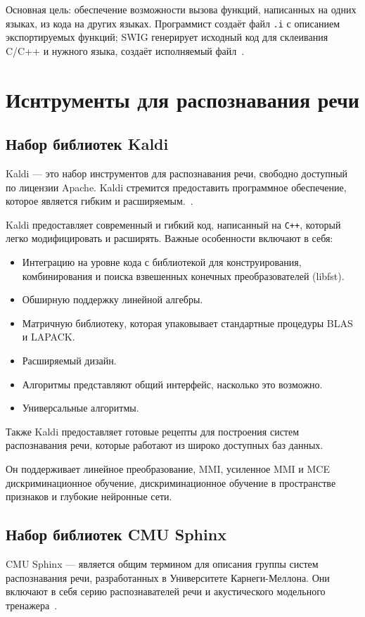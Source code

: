 Основная цель: обеспечение возможности вызова
функций, написанных на одних языках, из кода на других языках. Программист
создаёт файл \texttt{.i} с описанием экспортируемых функций; SWIG генерирует исходный код
для склеивания C/C++ и нужного языка, создаёт исполняемый файл~\cite{swig}.



\section{Иснтрументы для распознавания речи}

\subsection{Набор библиотек Kaldi}
Kaldi --- это набор инструментов для распознавания речи, свободно доступный по
лицензии Apache. Kaldi стремится предоставить программное обеспечение, которое
является гибким и расширяемым.~\cite{kaldi}.

Kaldi предоставляет современный и гибкий код, написанный на \texttt{C++}, который
легко модифицировать и расширять. Важные особенности включают в себя:

\begin{itemize}
    \item Интеграцию на уровне кода с библиотекой для конструирования, комбинирования
        и поиска взвешенных конечных преобразователей (libfst).
    \item Обширную поддержку линейной алгебры.
    \item Матричную библиотеку, которая упаковывает стандартные процедуры BLAS и LAPACK.
    \item Расширяемый дизайн.
    \item Алгоритмы представляют общий интерфейс, насколько это возможно.
    \item Универсальные алгоритмы.
\end{itemize}

Также Kaldi предоставляет готовые рецепты для построения систем \\
\mbox{распознавания} речи, которые работают из широко доступных баз данных.

Он поддерживает линейное преобразование, MMI,
усиленное MMI и MCE дискриминационное обучение, дискриминационное обучение в
пространстве признаков и глубокие нейронные сети.

\subsection{Набор библиотек CMU Sphinx}
CMU Sphinx --- является общим термином для описания группы систем распознавания
речи, разработанных в Университете Карнеги-Меллона. Они включают в себя серию
распознавателей речи и акустического модельного тренажера~\cite{sphinx}.

